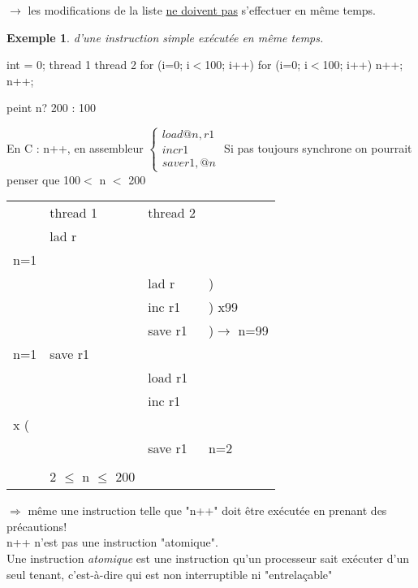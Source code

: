 \documentclass[12pt,a4paper]{report}
\newtheorem*{ex}{Exemple}
\begin{document}
$\rightarrow$ les modifications de la liste \underline{ne doivent pas} s'effectuer en même temps.\\

\begin{ex} d'une instruction simple exécutée en même temps.\end{ex}
\begin{verbatimtab}
                           int = 0;
thread 1                                thread 2
for (i=0; i$<$100; i++)                 for (i=0; i$<$100; i++)
    n++;                                     n++;

                        peint n? 200 : 100
\end{verbatimtab}
En C : n++, en assembleur $\left\{\begin{array}{l} load @n, r1\\ inc r1 \\ save r1,@n
\end{array} \right.$
Si pas toujours synchrone on pourrait penser que 100$<$ n $<$ 200\\

\begin{center}
\begin{tabular}{lp{4cm}p{4cm}l}
& thread 1 & thread 2 & \\
& lad r & &\\
n=1 & & &\\
\hdashline
& & lad r & ) \\
& & inc r1 & ) x99\\
& & save r1 & )$\rightarrow$ n=99\\
\hdashline
n=1 & save r1 & & \\
\hdashline
& & load r1 & \\
& & inc r1 & \\
\hdashline
99 x ( & & &\\
\hdashline
& & save r1 & n=2\\
\\
& 2 $\leq$ n $\leq$ 200 
\end{tabular}
\end{center}

$\Rightarrow$ même une instruction telle que "n++" doit être exécutée en prenant des précautions!\\
n++ n'est pas une instruction "atomique".\\
Une instruction \emph{atomique} est une instruction qu'un processeur sait exécuter d'un seul tenant, c'est-à-dire qui est non interruptible ni "entrelaçable"\\
\end{document}
